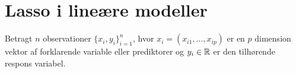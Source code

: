 \chapter{Lasso i lineære modeller}

Betragt \(n\) observationer \(\{x_i, y_i\}_{i=1}^n \), hvor $x_i=(x_{i1}, \ldots, x_{ip})$ er en $p$ dimension vektor af forklarende variable eller prediktorer og $y_i \in \mathbb{R}$ er den tilhørende respons variabel.



